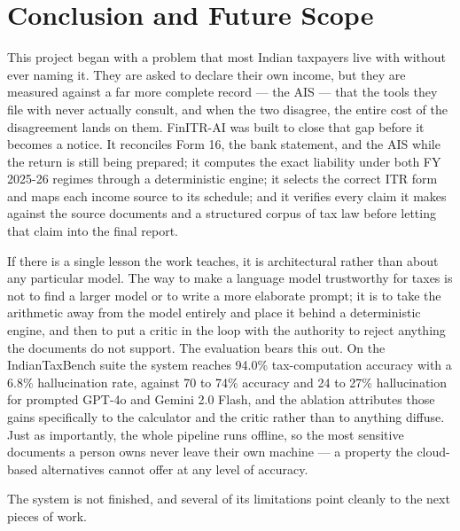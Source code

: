 
\chapter{Conclusion and Future Scope}
\label{chap:conclusion}

This project began with a problem that most Indian taxpayers live with without
ever naming it. They are asked to declare their own income, but they are
measured against a far more complete record --- the AIS --- that the tools they
file with never actually consult, and when the two disagree, the entire cost of
the disagreement lands on them. FinITR-AI was built to close that gap before it
becomes a notice. It reconciles Form 16, the bank statement, and the AIS while
the return is still being prepared; it computes the exact liability under both
FY 2025-26 regimes through a deterministic engine; it selects the correct ITR
form and maps each income source to its schedule; and it verifies every claim it
makes against the source documents and a structured corpus of tax law before
letting that claim into the final report.

If there is a single lesson the work teaches, it is architectural rather than
about any particular model. The way to make a language model trustworthy for
taxes is not to find a larger model or to write a more elaborate prompt; it is to
take the arithmetic away from the model entirely and place it behind a
deterministic engine, and then to put a critic in the loop with the authority to
reject anything the documents do not support. The evaluation bears this out. On
the IndianTaxBench suite the system reaches 94.0\% tax-computation accuracy with
a 6.8\% hallucination rate, against 70 to 74\% accuracy and 24 to 27\%
hallucination for prompted GPT-4o and Gemini 2.0 Flash, and the ablation
attributes those gains specifically to the calculator and the critic rather than
to anything diffuse. Just as importantly, the whole pipeline runs offline, so
the most sensitive documents a person owns never leave their own machine --- a
property the cloud-based alternatives cannot offer at any level of accuracy.

The system is not finished, and several of its limitations point cleanly to the
next pieces of work.

